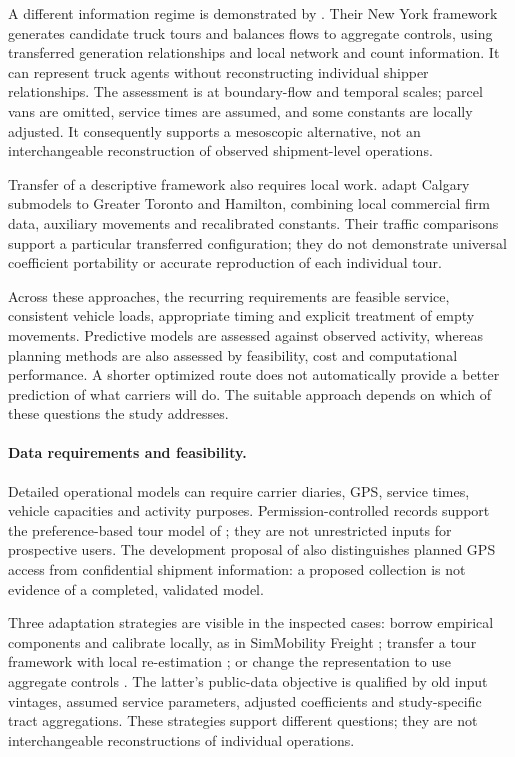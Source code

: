 A different information regime is demonstrated by \textcite{davis2024}.
Their New York framework generates candidate truck tours and balances flows to
aggregate controls, using transferred generation relationships and local network
and count information. It can represent truck agents without reconstructing
individual shipper relationships. The assessment is at boundary-flow and temporal
scales; parcel vans are omitted, service times are assumed, and some constants
are locally adjusted. It consequently supports a mesoscopic alternative, not an
interchangeable reconstruction of observed shipment-level operations.

Transfer of a descriptive framework also requires local work.
\Textcite{ferguson2012} adapt Calgary submodels to Greater Toronto and Hamilton,
combining local commercial firm data, auxiliary movements and recalibrated
constants. Their traffic comparisons support a particular transferred
configuration; they do not demonstrate universal coefficient portability or
accurate reproduction of each individual tour.

Across these approaches, the recurring requirements are feasible service,
consistent vehicle loads, appropriate timing and explicit treatment of empty
movements. Predictive models are assessed against observed activity, whereas
planning methods are also assessed by feasibility, cost and computational
performance. A shorter optimized route does not automatically provide a better
prediction of what carriers will do. The suitable approach depends on which of
these questions the study addresses.

\paragraph{Data requirements and feasibility.}
Detailed operational models can require carrier diaries, GPS, service times,
vehicle capacities and activity purposes. Permission-controlled records support
the preference-based tour model of \textcite{nadi2024}; they are not unrestricted
inputs for prospective users. The development proposal of \textcite{moore2017}
also distinguishes planned GPS access from confidential shipment information:
a proposed collection is not evidence of a completed, validated model.

Three adaptation strategies are visible in the inspected cases: borrow empirical
components and calibrate locally, as in SimMobility Freight
\parencite{sakai2020}; transfer a tour framework with local re-estimation
\parencite{ferguson2012}; or change the representation to use aggregate controls
\parencite{davis2024}. The latter's public-data objective is qualified by old
input vintages, assumed service parameters, adjusted coefficients and
study-specific tract aggregations. These strategies support different questions;
they are not interchangeable reconstructions of individual operations.


